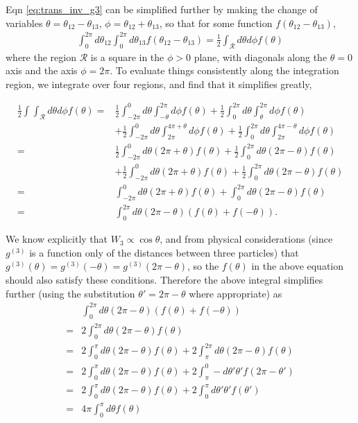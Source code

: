 \documentclass[../main.tex]{subfiles}
\begin{document}
Eqn \ref{eq:trans_inv_g3} can be simplified further by making the change
of variables
$\theta=\theta_{12}-\theta_{13}$, $\phi=\theta_{12}+\theta_{13}$,
so that for some function $f(\theta_{12}-\theta_{13})$,
\begin{align}
  \int_0^{2\pi}d\theta_{12}\int_0^{2\pi}d\theta_{13}
  f(\theta_{12}-\theta_{13})
  =\frac{1}{2}\int_{\mathcal{R}}d\theta d\phi f(\theta)
\end{align}
where the region $\mathcal{R}$ is a square in the $\phi>0$ plane,
with diagonals along the $\theta=0$ axis and the axis $\phi=2\pi$. To
evaluate things consistently along the integration region, we integrate
over four regions, and find that it simplifies greatly,
\begin{widetext}
  \begin{align}
    \frac{1}{2}\int\int_{\mathcal{R}}d\theta d\phi f(\theta)
    =&\frac{1}{2}\int_{-2\pi}^0d\theta
    \int_{-\theta}^{2\pi}d\phi f(\theta)
    +\frac{1}{2}\int_0^{2\pi}d\theta
    \int_{\theta}^{2\pi}d\phi f(\theta)\nonumber\\
    &+\frac{1}{2}\int_{-2\pi}^0d\theta
    \int_{2\pi}^{4\pi+\theta}d\phi f(\theta)
    +\frac{1}{2}\int_0^{2\pi}d\theta
    \int_{2\pi}^{4\pi-\theta}d\phi f(\theta)\nonumber\\
    =&\frac{1}{2}\int_{-2\pi}^0d\theta
    (2\pi+\theta) f(\theta)
    +\frac{1}{2}\int_0^{2\pi}d\theta
    (2\pi-\theta) f(\theta)\nonumber\\
    &+\frac{1}{2}\int_{-2\pi}^0d\theta
    (2\pi+\theta) f(\theta)
    +\frac{1}{2}\int_0^{2\pi}d\theta
    (2\pi-\theta) f(\theta)\nonumber\\
    =&\int_{-2\pi}^0d\theta
    (2\pi+\theta) f(\theta)
    +\int_0^{2\pi}d\theta
    (2\pi-\theta) f(\theta)\nonumber\\
    =&\int_0^{2\pi}d\theta
    (2\pi-\theta) (f(\theta)+f(-\theta)).
  \end{align}
\end{widetext}
We know explicitly that $W_3\propto\cos\theta$, and from physical
considerations (since $g^{(3)}$ is a function only of the distances
between three particles) that
$g^{(3)}(\theta)=g^{(3)}(-\theta)=g^{(3)}(2\pi-\theta)$, so the
$f(\theta)$ in the above equation should also satisfy these conditions.
Therefore the above integral simplifies further (using the substitution
$\theta'=2\pi-\theta$ where appropriate) as
\begin{align}
  &\int_0^{2\pi}d\theta
  (2\pi-\theta) (f(\theta)+f(-\theta))\nonumber\\
  =&2\int_0^{2\pi}d\theta(2\pi-\theta)f(\theta)\nonumber\\
  =&2\int_0^{\pi}d\theta(2\pi-\theta)f(\theta)+
  2\int_{\pi}^{2\pi}d\theta(2\pi-\theta)f(\theta)\nonumber\\
  =&2\int_0^{\pi}d\theta(2\pi-\theta)f(\theta)+
  2\int_{\pi}^{0}-d\theta'\theta'f(2\pi-\theta')\nonumber\\
  =&2\int_0^{\pi}d\theta(2\pi-\theta)f(\theta)+
  2\int_0^{\pi}d\theta'\theta'f(\theta')\nonumber\\
  =&4\pi\int_0^{\pi}d\theta f(\theta)
\end{align}
\end{document}
